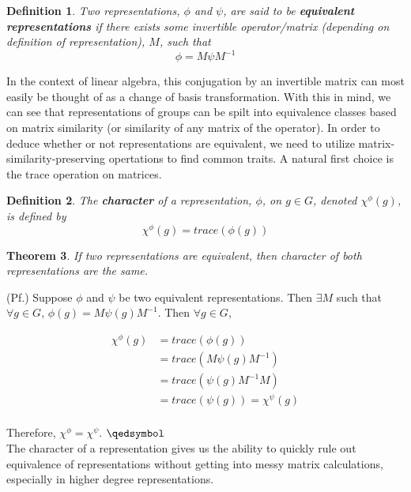 \documentclass[10pt]{ucthesis}
\newtheorem{definition}{Definition}[chapter]
\newtheorem{theorem}[definition]{Theorem}
\begin{document}
\begin{definition}
	Two representations, $\phi$ and $\psi$, are said to be \textbf{equivalent representations} if there exists some invertible operator/matrix (depending on definition of representation), $M$, such that $$\phi = M \psi M^{-1}$$
\end{definition}

In the context of linear algebra, this conjugation by an invertible matrix can most easily be thought of as a change of basis transformation. With this in mind, we can see that representations of groups can be spilt into equivalence classes based on matrix similarity (or similarity of any matrix of the operator). In order to deduce whether or not representations are equivalent, we need to utilize matrix-similarity-preserving opertations to find common traits. A natural first choice is the trace operation on matrices.

\begin{definition}
	The \textbf{character} of a representation, $\phi$, on $g \in G$, denoted $\chi^{\phi}(g)$, is defined by $$\chi^{\phi}(g)=trace(\phi(g))$$
\end{definition}

\begin{theorem}
	If two representations are equivalent, then character of both representations are the same.
\end{theorem}

(Pf.) Suppose $\phi$ and $\psi$ be two equivalent representations. Then $\exists M$ such that $\forall g \in G$, $\phi(g) = M\psi(g)M^{-1}$. Then $\forall g \in G$,

\begin{equation}
	\begin{aligned}
		\chi^{\phi}(g) &= trace(\phi(g)) \\
						&= trace(M\psi(g)M^{-1}) \\
						&= trace(\psi(g)M^{-1}M) \\
						&= trace(\psi(g)) = \chi^{\psi}(g) \\
	\end{aligned}
\end{equation}

Therefore, $\chi^{\phi} = \chi^{\psi}$. $\qedsymbol$\\

The character of a representation gives us the ability to quickly rule out equivalence of representations without getting into messy matrix calculations, especially in higher degree representations.
\end{document}

